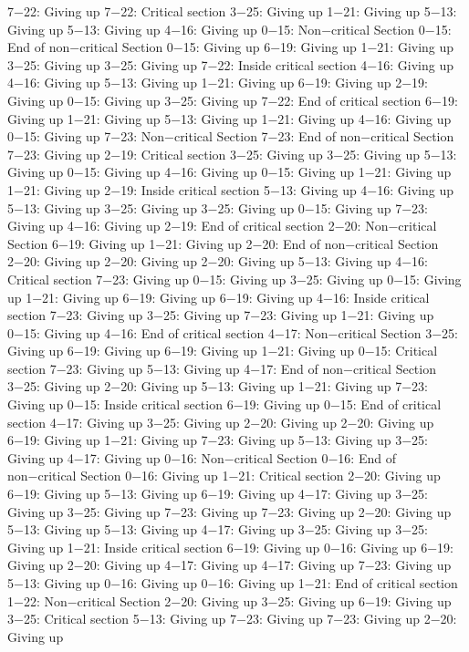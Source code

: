 7−22: Giving up
7−22: Critical section
3−25: Giving up
1−21: Giving up
5−13: Giving up
5−13: Giving up
4−16: Giving up
0−15: Non−critical Section
0−15: End of non−critical Section
0−15: Giving up
6−19: Giving up
1−21: Giving up
3−25: Giving up
3−25: Giving up
7−22: Inside critical section
4−16: Giving up
4−16: Giving up
5−13: Giving up
1−21: Giving up
6−19: Giving up
2−19: Giving up
0−15: Giving up
3−25: Giving up
7−22: End of critical section
6−19: Giving up
1−21: Giving up
5−13: Giving up
1−21: Giving up
4−16: Giving up
0−15: Giving up
7−23: Non−critical Section
7−23: End of non−critical Section
7−23: Giving up
2−19: Critical section
3−25: Giving up
3−25: Giving up
5−13: Giving up
0−15: Giving up
4−16: Giving up
0−15: Giving up
1−21: Giving up
1−21: Giving up
2−19: Inside critical section
5−13: Giving up
4−16: Giving up
5−13: Giving up
3−25: Giving up
3−25: Giving up
0−15: Giving up
7−23: Giving up
4−16: Giving up
2−19: End of critical section
2−20: Non−critical Section
6−19: Giving up
1−21: Giving up
2−20: End of non−critical Section
2−20: Giving up
2−20: Giving up
2−20: Giving up
5−13: Giving up
4−16: Critical section
7−23: Giving up
0−15: Giving up
3−25: Giving up
0−15: Giving up
1−21: Giving up
6−19: Giving up
6−19: Giving up
4−16: Inside critical section
7−23: Giving up
3−25: Giving up
7−23: Giving up
1−21: Giving up
0−15: Giving up
4−16: End of critical section
4−17: Non−critical Section
3−25: Giving up
6−19: Giving up
6−19: Giving up
1−21: Giving up
0−15: Critical section
7−23: Giving up
5−13: Giving up
4−17: End of non−critical Section
3−25: Giving up
2−20: Giving up
5−13: Giving up
1−21: Giving up
7−23: Giving up
0−15: Inside critical section
6−19: Giving up
0−15: End of critical section
4−17: Giving up
3−25: Giving up
2−20: Giving up
2−20: Giving up
6−19: Giving up
1−21: Giving up
7−23: Giving up
5−13: Giving up
3−25: Giving up
4−17: Giving up
0−16: Non−critical Section
0−16: End of non−critical Section
0−16: Giving up
1−21: Critical section
2−20: Giving up
6−19: Giving up
5−13: Giving up
6−19: Giving up
4−17: Giving up
3−25: Giving up
3−25: Giving up
7−23: Giving up
7−23: Giving up
2−20: Giving up
5−13: Giving up
5−13: Giving up
4−17: Giving up
3−25: Giving up
3−25: Giving up
1−21: Inside critical section
6−19: Giving up
0−16: Giving up
6−19: Giving up
2−20: Giving up
4−17: Giving up
4−17: Giving up
7−23: Giving up
5−13: Giving up
0−16: Giving up
0−16: Giving up
1−21: End of critical section
1−22: Non−critical Section
2−20: Giving up
3−25: Giving up
6−19: Giving up
3−25: Critical section
5−13: Giving up
7−23: Giving up
7−23: Giving up
2−20: Giving up
